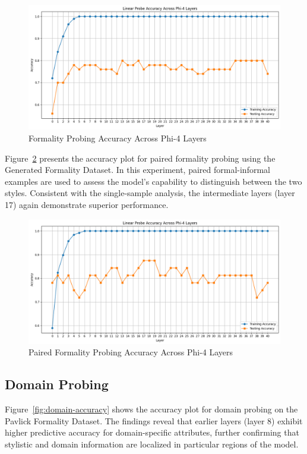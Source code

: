 \documentclass[twocolumn]{article}
\begin{document}
\begin{figure}
    \centering
    \includegraphics[width=1.0\textwidth]{figures/1_formality.png}
    \caption{Formality Probing Accuracy Across Phi-4 Layers}
    \label{fig:formality-accuracy}
\end{figure}

Figure~\ref{fig:paired-formality-accuracy} presents the accuracy plot for paired formality probing using the Generated Formality Dataset. In this experiment, paired formal-informal examples are used to assess the model’s capability to distinguish between the two styles. Consistent with the single-sample analysis, the intermediate layers (layer 17) again demonstrate superior performance.

\begin{figure}
    \centering
    \includegraphics[width=1.0\textwidth]{figures/2_pairedFormality.png}
    \caption{Paired Formality Probing Accuracy Across Phi-4 Layers}
    \label{fig:paired-formality-accuracy}
\end{figure}

\subsection{Domain Probing}
Figure~\ref{fig:domain-accuracy} shows the accuracy plot for domain probing on the Pavlick Formality Dataset. The findings reveal that earlier layers (layer 8) exhibit higher predictive accuracy for domain-specific attributes, further confirming that stylistic and domain information are localized in particular regions of the model.
\end{document}
